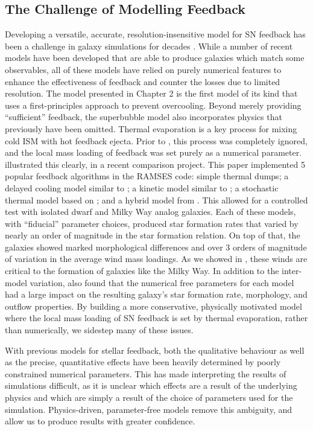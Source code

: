 \subsection{The Challenge of Modelling Feedback}
Developing a versatile, accurate, resolution-insensitive model for SN feedback
has been a challenge in galaxy simulations for decades
\citep{Katz1992,Rosdahl2016}.  While a number of recent models have been
developed that are able to produce galaxies which match some observables, all of
these models have relied on purely numerical features to enhance the
effectiveness of feedback and counter the losses due to limited resolution.  The
\citet{Keller2014} model presented in Chapter 2 is the first model of its kind
that uses a first-principles approach to prevent overcooling.  Beyond merely
providing ``sufficient'' feedback, the superbubble model also incorporates
physics that previously have been omitted.  Thermal evaporation is a key process
for mixing cold ISM with hot feedback ejecta.  Prior to \citet{Keller2014}, this
process was completely ignored, and the local mass loading of feedback was set
purely as a numerical parameter.  \citet{Rosdahl2016} illustrated this clearly,
in a recent comparison project.  This paper implemented 5 popular feedback
algorithms in the {\sc RAMSES} code: simple thermal dumps; a delayed cooling
model similar to \citet{Agertz2013}; a kinetic model similar to
\citet{DallaVecchia2008}; a stochastic thermal model based on
\citet{DallaVecchia2012}; and a hybrid model from \citet{Kimm2015}.  This
allowed for a controlled test with isolated dwarf and Milky Way analog galaxies.
Each of these models, with ``fiducial'' parameter choices, produced star
formation rates that varied by nearly an order of magnitude in the
\citet{Kennicutt1998} star formation relation.  On top of that, the galaxies
showed marked morphological differences and over 3 orders of magnitude of
variation in the average wind mass loadings.  As we showed in
\citet{Keller2015}, these winds are critical to the formation of galaxies like
the Milky Way.  In addition to the inter-model variation, \citet{Rosdahl2016}
also found that the numerical free parameters for each model had a large impact
on the resulting galaxy's star formation rate, morphology, and outflow
properties.  By building a more conservative, physically motivated model where
the local mass loading of SN feedback is set by thermal evaporation, rather than
numerically, we sidestep many of these issues.

With previous models for stellar feedback, both the qualitative behaviour as
well as the precise, quantitative effects have been heavily determined by
poorly constrained numerical parameters.  This has made interpreting the results
of simulations difficult, as it is unclear which effects are a result of
the underlying physics and which are simply a result of the choice of parameters
used for the simulation.  Physics-driven, parameter-free models remove this
ambiguity, and allow us to produce results with greater confidence.  



